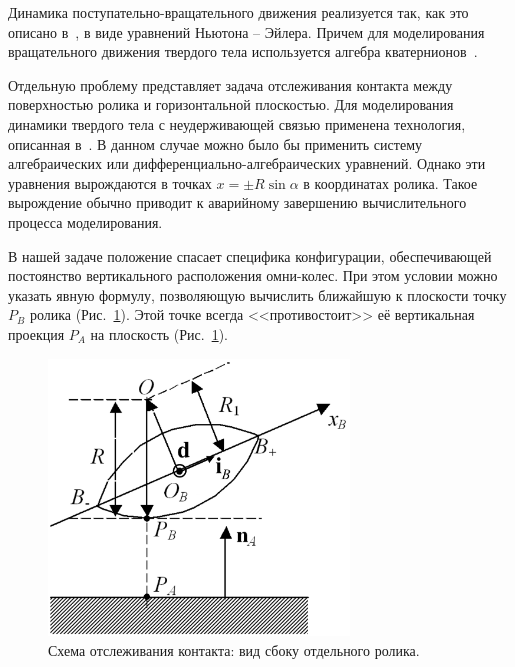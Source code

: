 Динамика поступательно-вращательного движения реализуется так, как это описано
в~\cite{Kosenko2007}, в виде уравнений Ньютона -- Эйлера. Причем для 
моделирования вращательного движения твердого тела используется алгебра 
кватернионов~\cite{KosenkoQuaternionRus,Kosenko1998}.

Отдельную проблему представляет задача отслеживания контакта между поверхностью 
ролика и горизонтальной плоскостью. Для моделирования динамики твердого тела с
неудерживающей связью применена технология, описанная в~\cite{Kosenko2006}. В
данном случае можно было бы применить систему алгебраических или 
дифференциально-алгебраических уравнений. Однако эти уравнения вырождаются в 
точках $x=\pm R\sin\alpha $ в координатах ролика. Такое вырождение обычно 
приводит к аварийному завершению вычислительного процесса моделирования.

В нашей задаче положение спасает специфика конфигурации, обеспечивающей 
постоянство вертикального расположения омни-колес. При этом условии можно
указать явную формулу, позволяющую вычислить ближайшую к плоскости точку $P_B$
ролика (Рис.~\ref{ContactScheme}). Этой точке всегда <<противостоит>> её 
вертикальная проекция $P_A$ на плоскость (Рис.~\ref{ContactScheme}).

\begin{figure}[htb]
\centering\includegraphics[width=8cm]{content/parts/3_friction/nd/RollerSection_d_ib.png}
\caption{Схема отслеживания контакта: вид сбоку отдельного ролика.}
\label{ContactScheme}
\end{figure}

